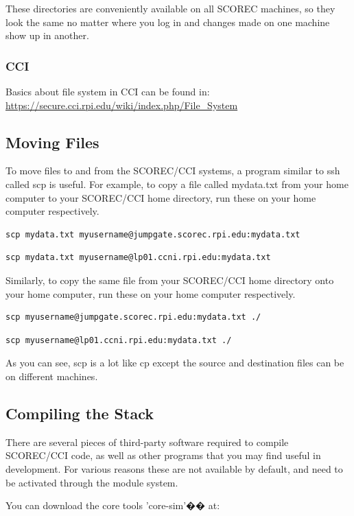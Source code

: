 \documentclass{article}
\begin{document}
These directories are conveniently available on all SCOREC machines, so they look the same no matter where you log in and changes made on one machine show up in another.

\subsubsection{CCI}
Basics about file system in CCI can be found in: \\
\url{https://secure.cci.rpi.edu/wiki/index.php/File\_System}

\subsection{Moving Files}
\label{ch:1.3}
To move files to and from the SCOREC/CCI systems, a program similar to ssh called scp is useful. For example, to copy a file called mydata.txt from your home computer to your SCOREC/CCI home directory, run these on your home computer respectively.
\begin{lstlisting}
scp mydata.txt myusername@jumpgate.scorec.rpi.edu:mydata.txt
\end{lstlisting}
\begin{lstlisting} 
scp mydata.txt myusername@lp01.ccni.rpi.edu:mydata.txt
\end{lstlisting}

Similarly, to copy the same file from your SCOREC/CCI home directory onto your home computer, run these on your home computer respectively.

\begin{lstlisting}
scp myusername@jumpgate.scorec.rpi.edu:mydata.txt ./
\end{lstlisting}
\begin{lstlisting} 
scp myusername@lp01.ccni.rpi.edu:mydata.txt ./
\end{lstlisting} 
As you can see, scp is a lot like cp except the source and destination files can be on different machines.

\subsection{Compiling the Stack}
\label{ch:1.4}
There are several pieces of third-party software required to compile SCOREC/CCI code, as well as other programs that you may find useful in development. For various reasons these are not available by default, and need to be activated through the module system. 

You can download the core tools 'core-sim'�� at:
\end{document}
